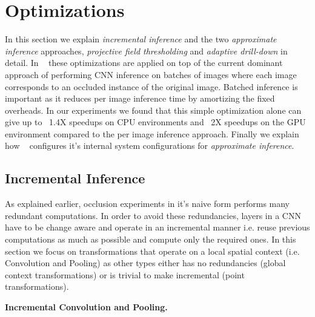 \section{Optimizations}\label{sec:optimizer}

In this section we explain \textit{incremental inference} and the two \textit{approximate inference} approaches, \textit{projective field thresholding} and \textit{adaptive drill-down} in detail.
In \system~ these optimizations are applied on top of the current dominant approach of performing CNN inference on batches of images where each image corresponds to an occluded instance of the original image.
Batched inference is important as it reduces per image inference time by amortizing the fixed overheads.
In our experiments we found that this simple optimization alone can give up to ~1.4X speedups on CPU environments and ~2X speedups on the GPU environment compared to the per image inference approach.
Finally we explain how \system~ configures it's internal system configurations for \textit{approximate inference}.

\subsection{Incremental Inference}\label{sec:inc_computation}

As explained earlier, occlusion experiments in it's naive form performs many redundant computations.
In order to avoid these redundancies, layers in a CNN have to be change aware and operate in an incremental manner i.e. reuse previous computations as much as possible and compute only the required ones.
In this section we focus on transformations that operate on a local spatial context (i.e. Convolution and Pooling) as other types either has no redundancies (global context transformations) or is trivial to make incremental (point transformations).

\vspace{2mm}
\noindent \textbf{Incremental Convolution and Pooling.}


